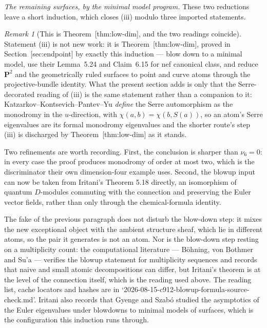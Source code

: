 \documentclass[11pt]{article}
\theoremstyle{definition}
\theoremstyle{remark}
\newtheorem{remark}[theorem]{Remark}
\newcommand{\PP}{\mathbf P}
\begin{document}
\emph{The remaining surfaces, by the minimal model program.} These two
reductions leave a short induction, which closes (iii) modulo three imported
statements.

\begin{remark}[This is Theorem~\textup{[thm:low-dim]}, and the two readings coincide]

Statement (iii) is not new work: it is Theorem~\textup{[thm:low-dim]}, proved in
Section~\textup{[sec:endpoint]} by exactly this induction --- blow down to a minimal
model, use their Lemma~5.24 and Claim~6.15 for nef canonical class, and reduce
$\PP^2$ and the geometrically ruled surfaces to point and curve atoms through the
projective-bundle identity. What the present section adds is only that the
Serre-decorated reading of (iii) is the same statement rather than a companion to
it: Katzarkov--Kontsevich--Pantev--Yu \emph{define} the Serre automorphism as the
monodromy in the $u$-direction, with $\chi(a,b)=\chi(b,S(a))$, so an atom's Serre
eigenvalues are its formal monodromy eigenvalues and the shorter route's step
(iii) is discharged by Theorem~\textup{[thm:low-dim]} as it stands.

Two refinements are worth recording. First, the conclusion is sharper than
$\nu_6=0$: in every case the proof produces monodromy of order at most two, which
is the discriminator their own dimension-four example uses. Second, the blowup
input can now be taken from Iritani's Theorem 5.18 directly, an isomorphism of
quantum $D$-modules commuting with the connection and preserving the Euler
vector fields, rather than only through the chemical-formula identity.
\end{remark}

The fake of the previous paragraph does not disturb the blow-down step: it mixes
the new exceptional object with the ambient structure sheaf, which lie in
different atoms, so the pair it generates is not an atom. Nor is the blow-down
step resting on a multiplicity count: the computational literature --- Böhning,
von Bothmer and Su'a --- verifies the blowup statement for multiplicity
sequences and records that naive and small atomic decompositions can differ, but
Iritani's theorem is at the level of the connection itself, which is the reading
used above. The reading list, cache locators and hashes are in
`2026-08-15-c912-blowup-formula-source-check.md'. Iritani also records that
Gyenge and Szab\'o studied the asymptotics of the Euler eigenvalues under
blowdowns to minimal models of surfaces, which is the configuration this
induction runs through.
\end{document}
